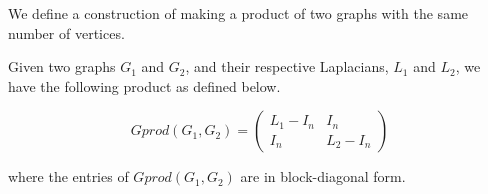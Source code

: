 We define a construction of making a product of two graphs with the same number of vertices.

\begin{definition}
    Given two graphs $G_1$ and $G_2$, and their respective Laplacians, $L_1$ and $L_2$, we have the following product as defined below.
    
    \begin{equation}
        Gprod(G_1,G_2) =
            \begin{pmatrix}
                L_1 - I_n &   I_n \\
                I_n         &   L_2 - I_n
            \end{pmatrix}
    \end{equation}
    
    where the entries of $Gprod(G_1,G_2)$ are in block-diagonal form.
\end{definition}